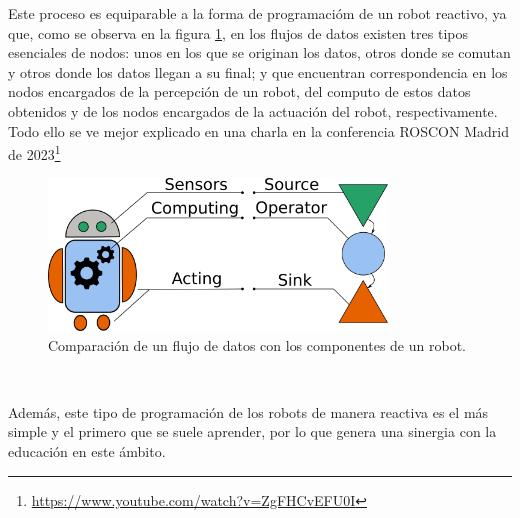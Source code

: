 Este proceso es equiparable a la forma de programacióm de un robot reactivo, ya
que, como se observa en la figura \ref{fig:data_flow_vs_robotics}, en los flujos
de datos existen tres tipos esenciales de nodos: unos en los que se originan los
datos, otros donde se comutan y otros donde los datos llegan a su final; y que
encuentran correspondencia en los nodos encargados de la percepción de un robot,
del computo de estos datos obtenidos y de los nodos encargados de la actuación
del robot, respectivamente.
Todo ello se ve mejor explicado en una charla en la conferencia ROSCON Madrid de
2023\footnote{\url{https://www.youtube.com/watch?v=ZgFHCvEFU0I}}

\begin{figure} [h!]
  \begin{center}
    \includegraphics[width=9cm]{figs/data-flow_vs_robotics_scheme}
  \end{center}
  \caption{Comparación de un flujo de datos con los componentes de un robot.}
  \label{fig:data_flow_vs_robotics}
\end{figure}\

Además, este tipo de programación de los robots de manera reactiva es el más
simple y el primero que se suele aprender, por lo que genera una sinergia con la
educación en este ámbito.
















